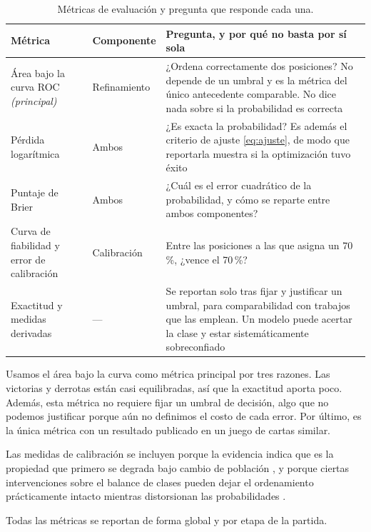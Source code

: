 \begin{table}[!t]
\centering
\caption{Métricas de evaluación y pregunta que responde cada una.}
\label{tab:metricas}
\footnotesize
\begin{tabularx}{\columnwidth}{@{}P{1.6cm} P{1.3cm} Y@{}}
\toprule
\textbf{Métrica} & \textbf{Componente} & \textbf{Pregunta, y por qué no
basta por sí sola}\\
\midrule
Área bajo la curva ROC \newline \textit{(principal)} & Refinamiento &
¿Ordena correctamente dos posiciones? No depende de un umbral y es la
métrica del único antecedente comparable. No dice nada sobre si la
probabilidad es correcta\\
Pérdida logarítmica & Ambos &
¿Es exacta la probabilidad? Es además el criterio de ajuste
\eqref{eq:ajuste}, de modo que reportarla muestra si la optimización tuvo
éxito\\
Puntaje de Brier & Ambos &
¿Cuál es el error cuadrático de la probabilidad, y cómo se reparte entre
ambos componentes?\\
Curva de fiabilidad y error de calibración & Calibración &
Entre las posiciones a las que asigna un 70\,\%, ¿vence el 70\,\%?\\
Exactitud y medidas derivadas & --- &
Se reportan solo tras fijar y justificar un umbral, para comparabilidad con
trabajos que las emplean. Un modelo puede acertar la clase y estar
sistemáticamente sobreconfiado\\
\bottomrule
\end{tabularx}
\end{table}

Usamos el área bajo la curva como métrica principal por tres razones. Las
victorias y derrotas están casi equilibradas, así que la exactitud aporta
poco. Además, esta métrica no requiere fijar un umbral de decisión, algo que
no podemos justificar porque aún no definimos el costo de cada error. Por
último, es la única métrica con un resultado publicado en un juego de cartas
similar.

Las medidas de calibración se incluyen porque la evidencia indica que es la
propiedad que primero se degrada bajo cambio de población
\cite{guo_temporalshift_2021,xenopoulos_winprob_2022}, y porque ciertas
intervenciones sobre el balance de clases pueden dejar el ordenamiento
prácticamente intacto mientras distorsionan las probabilidades
\cite{vandenGoorbergh_imbalance_2022}.

Todas las métricas se reportan de forma global y por etapa de la partida.

